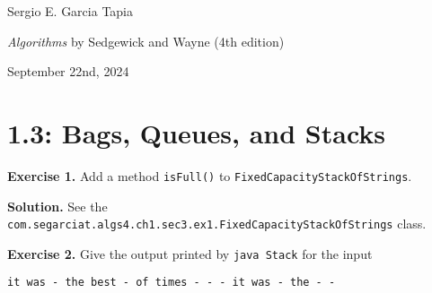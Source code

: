 \documentclass[12pt, a4paper]{article}
\newenvironment{ex}[2][Exercise]
{\par\medskip\noindent \textbf{#1 #2.}}
{\medskip}
\newenvironment{sol}[1][Solution]
{\par\medskip\noindent \textbf{#1.} }
{\medskip}
\begin{document}
	\noindent Sergio E. Garcia Tapia \hfill
	
	\noindent \emph{Algorithms} by Sedgewick and Wayne (4th edition) \cite{sedgewick_wayne}\hfill
	
	\noindent September 22nd, 2024\hfill 
	\section*{1.3: Bags, Queues, and Stacks}
	
	\begin{ex}{1}
		Add a method \texttt{isFull()} to \texttt{FixedCapacityStackOfStrings}.
	\end{ex}

	\begin{sol}
		See the \texttt{com.segarciat.algs4.ch1.sec3.ex1.FixedCapacityStackOfStrings}
		class.
	\end{sol}
	
	\begin{ex}{2}
		Give the output printed by \texttt{java Stack} for the input
		\begin{lstlisting}[language={}]
	it was - the best - of times - - - it was - the - -
		\end{lstlisting}
	\end{ex}
	
\end{document}
